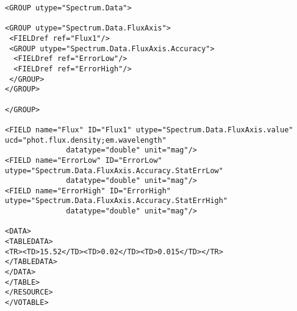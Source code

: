 {\begin{flushleft}
\begin{fmpage}
\begin{verbatim}
<GROUP utype="Spectrum.Data">

<GROUP utype="Spectrum.Data.FluxAxis">
 <FIELDref ref="Flux1"/>
 <GROUP utype="Spectrum.Data.FluxAxis.Accuracy">
  <FIELDref ref="ErrorLow"/>
  <FIELDref ref="ErrorHigh"/>
 </GROUP>
</GROUP>

</GROUP>

<FIELD name="Flux" ID="Flux1" utype="Spectrum.Data.FluxAxis.value" ucd="phot.flux.density;em.wavelength" 
              datatype="double" unit="mag"/>
<FIELD name="ErrorLow" ID="ErrorLow" utype="Spectrum.Data.FluxAxis.Accuracy.StatErrLow" 
              datatype="double" unit="mag"/>
<FIELD name="ErrorHigh" ID="ErrorHigh" utype="Spectrum.Data.FluxAxis.Accuracy.StatErrHigh" 
              datatype="double" unit="mag"/>

<DATA>
<TABLEDATA>
<TR><TD>15.52</TD><TD>0.02</TD><TD>0.015</TD></TR>
</TABLEDATA>
</DATA>
</TABLE>
</RESOURCE>
</VOTABLE>

\end{verbatim}
\end{fmpage}

\end{flushleft}
}



